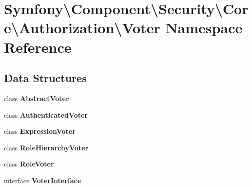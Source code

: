 \section{Symfony\textbackslash{}Component\textbackslash{}Security\textbackslash{}Core\textbackslash{}Authorization\textbackslash{}Voter Namespace Reference}
\label{namespace_symfony_1_1_component_1_1_security_1_1_core_1_1_authorization_1_1_voter}
\subsection*{Data Structures}
\begin{DoxyCompactItemize}
\item 
class {\bf Abstract\+Voter}
\item 
class {\bf Authenticated\+Voter}
\item 
class {\bf Expression\+Voter}
\item 
class {\bf Role\+Hierarchy\+Voter}
\item 
class {\bf Role\+Voter}
\item 
interface {\bf Voter\+Interface}
\end{DoxyCompactItemize}

